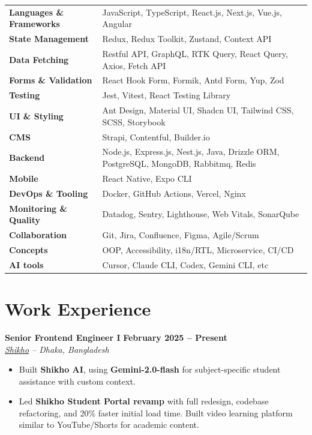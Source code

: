 \documentclass[11pt,a4paper]{article}
\newcommand{\role}[4]{
    \noindent\textbf{\large #1} \hfill \textbf{#2} \\
    \textit{#3} \hfill \textit{#4}
    \vspace{2pt}
}
\begin{document}
\begin{tabularx}{\textwidth}{@{}l X@{}}
\textbf{Languages \& Frameworks} & JavaScript, TypeScript, React.js, Next.js, Vue.js, Angular \\[2pt]
\textbf{State Management}        & Redux, Redux Toolkit, Zustand, Context API \\[2pt]
\textbf{Data Fetching}           & Restful API, GraphQL, RTK Query, React Query, Axios, Fetch API \\[2pt]
\textbf{Forms \& Validation}     & React Hook Form, Formik, Antd Form, Yup, Zod \\[2pt]
\textbf{Testing}                 & Jest, Vitest, React Testing Library \\[2pt]
\textbf{UI \& Styling}           & Ant Design, Material UI, Shadcn UI, Tailwind CSS, SCSS, Storybook \\[2pt]
\textbf{CMS}                     & Strapi, Contentful, Builder.io \\[2pt]
\textbf{Backend}                 & Node.js, Express.js, Nest.js, Java, Drizzle ORM, PostgreSQL, MongoDB, Rabbitmq, Redis \\[2pt]
\textbf{Mobile}                  & React Native, Expo CLI \\[2pt]
\textbf{DevOps \& Tooling}       & Docker, GitHub Actions, Vercel, Nginx \\[2pt]
\textbf{Monitoring \& Quality}   & Datadog, Sentry, Lighthouse, Web Vitals, SonarQube \\[2pt]
\textbf{Collaboration}           & Git, Jira, Confluence, Figma, Agile/Scrum \\[2pt]
\textbf{Concepts}                & OOP, Accessibility, i18n/RTL, Microservice, CI/CD \\[2pt]
\textbf{AI tools}                & Cursor, Claude CLI, Codex, Gemini CLI,  etc \\[2pt]
\end{tabularx}

\section{Work Experience}

\role{Senior Frontend Engineer I}{February 2025 -- Present}{\href{https://shikho.com}{Shikho} -- Dhaka, Bangladesh}{}

\begin{itemize}[leftmargin=16pt, nosep]
    \item Built \textbf{Shikho AI}, using \textbf{Gemini-2.0-flash} for subject-specific student assistance with custom context.
    \item Led \textbf{Shikho Student Portal revamp} with full redesign, codebase refactoring, and 20\% faster initial load time. Built video learning platform similar to YouTube/Shorts for academic content.
\end{itemize}
\end{document}
